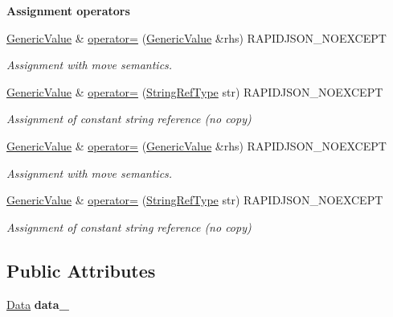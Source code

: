 \begin{Indent}{\bf Assignment operators}\par
\begin{DoxyCompactItemize}
\item 
\hyperlink{class_generic_value}{Generic\+Value} \& \hyperlink{class_generic_value_a9018a40d7c52efc00daf803c51d3236c}{operator=} (\hyperlink{class_generic_value}{Generic\+Value} \&rhs) R\+A\+P\+I\+D\+J\+S\+O\+N\+\_\+\+N\+O\+E\+X\+C\+E\+PT
\begin{DoxyCompactList}\small\item\em Assignment with move semantics. \end{DoxyCompactList}\item 
\hyperlink{class_generic_value}{Generic\+Value} \& \hyperlink{class_generic_value_a386708557555e6389184de608af5e6a6}{operator=} (\hyperlink{class_generic_value_a32e0f30ee278072374c8168b14d3317f}{String\+Ref\+Type} str) R\+A\+P\+I\+D\+J\+S\+O\+N\+\_\+\+N\+O\+E\+X\+C\+E\+PT
\begin{DoxyCompactList}\small\item\em Assignment of constant string reference (no copy) \end{DoxyCompactList}\item 
\hyperlink{class_generic_value}{Generic\+Value} \& \hyperlink{class_generic_value_a9018a40d7c52efc00daf803c51d3236c}{operator=} (\hyperlink{class_generic_value}{Generic\+Value} \&rhs) R\+A\+P\+I\+D\+J\+S\+O\+N\+\_\+\+N\+O\+E\+X\+C\+E\+PT
\begin{DoxyCompactList}\small\item\em Assignment with move semantics. \end{DoxyCompactList}\item 
\hyperlink{class_generic_value}{Generic\+Value} \& \hyperlink{class_generic_value_a386708557555e6389184de608af5e6a6}{operator=} (\hyperlink{class_generic_value_a32e0f30ee278072374c8168b14d3317f}{String\+Ref\+Type} str) R\+A\+P\+I\+D\+J\+S\+O\+N\+\_\+\+N\+O\+E\+X\+C\+E\+PT
\begin{DoxyCompactList}\small\item\em Assignment of constant string reference (no copy) \end{DoxyCompactList}\end{DoxyCompactItemize}
\end{Indent}
\subsection*{Public Attributes}
\begin{DoxyCompactItemize}
\item 
\hyperlink{union_generic_value_1_1_data}{Data} {\bfseries data\+\_\+}\hypertarget{class_generic_value_aaf80f2c91d26fdde60b9edeeecd3509f}{}\label{class_generic_value_aaf80f2c91d26fdde60b9edeeecd3509f}

\end{DoxyCompactItemize}
